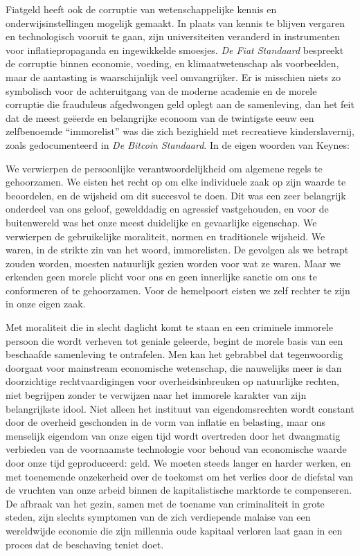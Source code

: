 Fiatgeld heeft ook de corruptie van wetenschappelijke kennis en onderwijsinstellingen mogelijk gemaakt. In plaats van kennis te blijven vergaren en technologisch vooruit te gaan, zijn universiteiten veranderd in instrumenten voor inflatiepropaganda en ingewikkelde smoesjes. \emph{De Fiat Standaard} bespreekt de corruptie binnen economie, voeding, en klimaatwetenschap als voorbeelden, maar de aantasting is waarschijnlijk veel omvangrijker. Er is misschien niets zo symbolisch voor de achteruitgang van de moderne academie en de morele corruptie die frauduleus afgedwongen geld oplegt aan de samenleving, dan het feit dat de meest geëerde en belangrijke econoom van de twintigste eeuw een zelfbenoemde ``immorelist'' was die zich bezighield met recreatieve kinderslavernij, zoals gedocumenteerd in \emph{De Bitcoin Standaard}. In de eigen woorden van Keynes:

\begin{blockquotebox}
    We verwierpen de persoonlijke verantwoordelijkheid om algemene regels te gehoorzamen. We eisten het recht op om elke individuele zaak op zijn waarde te beoordelen, en de wijsheid om dit succesvol te doen. Dit was een zeer belangrijk onderdeel van ons geloof, gewelddadig en agressief vastgehouden, en voor de buitenwereld was het onze meest duidelijke en gevaarlijke eigenschap. We verwierpen de gebruikelijke moraliteit, normen en traditionele wijsheid. We waren, in de strikte zin van het woord, immorelisten. De gevolgen als we betrapt zouden worden, moesten natuurlijk gezien worden voor wat ze waren. Maar we erkenden geen morele plicht voor ons en geen innerlijke sanctie om ons te conformeren of te gehoorzamen. Voor de hemelpoort eisten we zelf rechter te zijn in onze eigen zaak.\footnotemark
\end{blockquotebox}
\autocite{225}

Met moraliteit die in slecht daglicht komt te staan en een criminele immorele persoon die wordt verheven tot geniale geleerde, begint de morele basis van een beschaafde samenleving te ontrafelen. Men kan het gebrabbel dat tegenwoordig doorgaat voor mainstream economische wetenschap, die nauwelijks meer is dan doorzichtige rechtvaardigingen voor overheidsinbreuken op natuurlijke rechten, niet begrijpen zonder te verwijzen naar het immorele karakter van zijn belangrijkste idool. Niet alleen het instituut van eigendomsrechten wordt constant door de overheid geschonden in de vorm van inflatie en belasting, maar ons menselijk eigendom van onze eigen tijd wordt overtreden door het dwangmatig verbieden van de voornaamste technologie voor behoud van economische waarde door onze tijd geproduceerd: geld. We moeten steeds langer en harder werken, en met toenemende onzekerheid over de toekomst om het verlies door de diefstal van de vruchten van onze arbeid binnen de kapitalistische marktorde te compenseren. De afbraak van het gezin, samen met de toename van criminaliteit in grote steden, zijn slechts symptomen van de zich verdiepende malaise van een wereldwijde economie die zijn millennia oude kapitaal verloren laat gaan in een proces dat de beschaving teniet doet.

